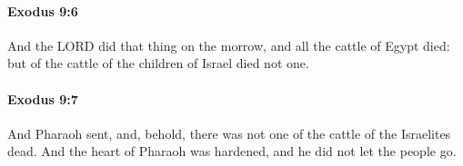 		\paragraph{Exodus 9:6} %
			\label{EXODUS-9-6}

			And the LORD did that thing on the morrow, and all the cattle of Egypt died: but of the cattle of the children of Israel died not one.


		\paragraph{Exodus 9:7} %
			\label{EXODUS-9-7}

			And Pharaoh sent, and, behold, there was not one of the cattle of the Israelites dead. And the heart of Pharaoh was hardened, and he did not let the people go.


